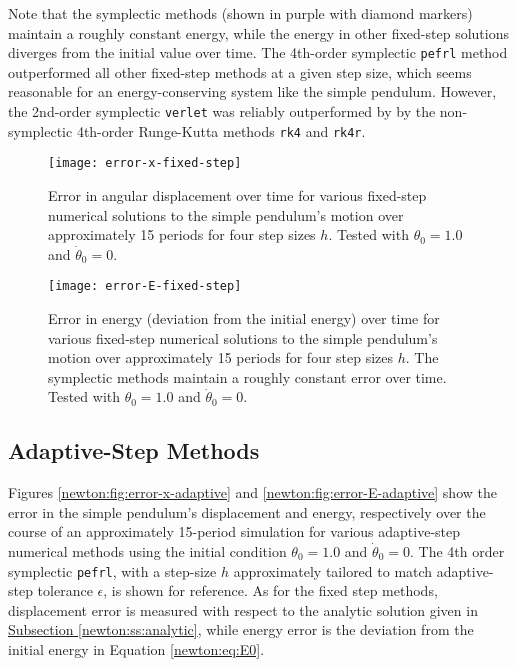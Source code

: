 \documentclass[11pt, a4paper]{article}
\begin{document}
Note that the symplectic methods (shown in purple with diamond markers) maintain a roughly constant energy, while the energy in other fixed-step solutions diverges from the initial value over time. The 4th-order symplectic \texttt{pefrl} method outperformed all other fixed-step methods at a given step size, which seems reasonable for an energy-conserving system like the simple pendulum. However, the 2nd-order symplectic \texttt{verlet} was reliably outperformed by by the non-symplectic 4th-order Runge-Kutta methods \texttt{rk4} and \texttt{rk4r}. 


\begin{figure}[htb!]
\centering
\texttt{[image: error-x-fixed-step]}

\caption{Error in angular displacement over time for various fixed-step numerical solutions to the simple pendulum's motion over approximately 15 periods for four step sizes $ h $. Tested with $ \theta_{0} = 1.0 $ and $ \dot{\theta}_{0} = 0 $.}

\label{newton:fig:error-x-fixed}
\end{figure}

\begin{figure}[htb!]
\centering
\texttt{[image: error-E-fixed-step]}

\caption{Error in energy (deviation from the initial energy) over time for various fixed-step numerical solutions to the simple pendulum's motion over approximately 15 periods for four step sizes $ h $. The symplectic methods maintain a roughly constant error over time. Tested with $ \theta_{0} = 1.0 $ and $ \dot{\theta}_{0} = 0 $.}

\label{newton:fig:error-E-fixed}
\end{figure}


\subsection{Adaptive-Step Methods}

Figures \ref{newton:fig:error-x-adaptive} and \ref{newton:fig:error-E-adaptive} show the error in the simple pendulum's displacement and energy, respectively over the course of an approximately 15-period simulation for various adaptive-step numerical methods using the initial condition  $ \theta_{0} = 1.0 $ and $ \dot{\theta}_{0} = 0 $. The 4th order symplectic \texttt{pefrl}, with a step-size $ h $ approximately tailored to match adaptive-step tolerance $ \epsilon $, is shown for reference. As for the fixed step methods, displacement error is measured with respect to the analytic solution given in \hyperref[newton:ss:analytic]{Subsection \ref{newton:ss:analytic}}, while energy error is the deviation from the initial energy in Equation \ref{newton:eq:E0}. 
\end{document}
